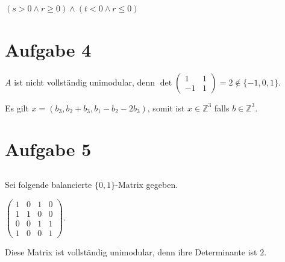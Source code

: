 \documentclass[a4paper]{article}
\begin{document}
\subsection{}
$(s > 0 \wedge r \geq 0) \wedge (t < 0 \wedge r \leq 0)$

\section{Aufgabe 4}
$A$ ist nicht vollständig unimodular, denn 
$\det \begin{pmatrix} 1&1\\-1&1 \end{pmatrix} = 2 \not\in \{ -1,0,1 \}$.

Es gilt $x = (b_3, b_2 + b_3, b_1 - b_2 - 2 b_3)$, somit ist $x \in
\mathbb{Z}^3$
falls $b \in \mathbb{Z}^3$.

\section{Aufgabe 5}
\subsection{}
\subsection{}
Sei folgende balancierte $\{0,1\}$-Matrix gegeben.

$\begin{pmatrix}
1 & 0 & 1 & 0 \\
1 & 1 & 0 & 0 \\
0 & 0 & 1 & 1 \\
1 & 0 & 0 & 1
\end{pmatrix}$.

Diese Matrix ist vollständig unimodular, denn ihre Determinante ist $2$.
\end{document}
